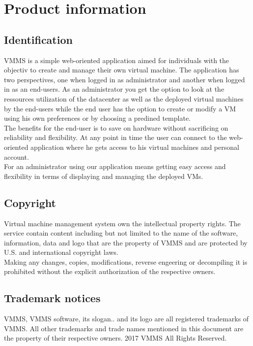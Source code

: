 \chapter{Product information}
\vspace{-6em}


\section{Identification}
VMMS is a simple web-oriented application aimed for individuals with the
objectiv to create and manage their own virtual machine. The application    
has two perspectives, one when logged in as administrator and another when
logged in as an end-users. As an administrator you get the option to look at
the ressources utilization of the datacenter as well as the deployed virtual
machines by the end-users while the end user has the option to create or modify 
a VM using his own preferences or by choosing a predined template.\\The benefits
for the end-user is to save on hardware without sacrificing on reliability and 
flexibility. At any point in time the user can connect to the web-oriented
application where he gets access to his virtual machines and personal
account.\\For an administrator using our application means getting easy access
and flexibility in terms of displaying and managing the deployed VMs.

\section{Copyright}

Virtual machine management system own the intellectual property rights. The
service contain content including  but not limited to the name of the software,
information, data and logo that are the property of VMMS and are protected by
U.S. and international copyright laws.\\Making any changes, copies,
modifications, reverse engeering or decompiling it is prohibited without the
explicit authorization of the respective owners.

\section{Trademark notices}

VMMS, VMMS software, its slogan.. and its logo are all registered trademarks of
VMMS. All other trademarks and trade names mentioned in this document are the
property of their respective owners. 2017 VMMS All Rights Reserved.

